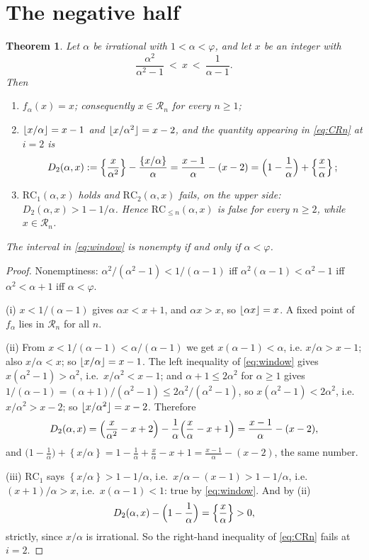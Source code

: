 \documentclass[11pt]{amsart}
\newtheorem{theorem}{Theorem}
\theoremstyle{remark}
\DeclarePairedDelimiter{\fl}{\lfloor}{\rfloor}
\newcommand{\fp}[1]{\left\{#1\right\}}
\newcommand{\RC}{\mathrm{RC}}
\begin{document}
\section{The negative half}\label{sec:B}

\begin{theorem}\label{thm:B}
Let $\alpha$ be irrational with $1<\alpha<\varphi$, and let $x$ be an integer with
\begin{equation}\label{eq:window}
 \frac{\alpha^{2}}{\alpha^{2}-1}\ <\ x\ <\ \frac1{\alpha-1}.
\end{equation}
Then
\begin{enumerate}
\item[(i)] $f_\alpha(x)=x$; consequently $x\in\mathcal R_n$ for every $n\ge1$;
\item[(ii)] $\fl{x/\alpha}=x-1$ and $\fl{x/\alpha^{2}}=x-2$, and the quantity appearing
 in \eqref{eq:CRn} at $i=2$ is
 \[
  D_2(\alpha,x):=\fp{\frac{x}{\alpha^{2}}}-\frac{\fp{x/\alpha}}{\alpha}
  =\frac{x-1}{\alpha}-(x-2)
  =\Bigl(1-\frac1\alpha\Bigr)+\fp{\frac x\alpha};
 \]
\item[(iii)] $\RC_1(\alpha,x)$ holds and $\RC_2(\alpha,x)$ fails, on the upper side:
 $D_2(\alpha,x)>1-1/\alpha$. Hence $\RC_{\le n}(\alpha,x)$ is false for every $n\ge2$,
 while $x\in\mathcal R_n$.
\end{enumerate}
The interval in \eqref{eq:window} is nonempty if and only if $\alpha<\varphi$.
\end{theorem}

\begin{proof}
Nonemptiness: $\alpha^{2}/(\alpha^{2}-1)<1/(\alpha-1)$ iff $\alpha^{2}(\alpha-1)<\alpha^{2}-1$
iff $\alpha^{2}<\alpha+1$ iff $\alpha<\varphi$.

(i) $x<1/(\alpha-1)$ gives $\alpha x<x+1$, and $\alpha x>x$, so $\fl{\alpha x}=x$. A
fixed point of $f_\alpha$ lies in $\mathcal R_n$ for all $n$.

(ii) From $x<1/(\alpha-1)<\alpha/(\alpha-1)$ we get $x(\alpha-1)<\alpha$, i.e.
$x/\alpha>x-1$; also $x/\alpha<x$; so $\fl{x/\alpha}=x-1$. The left inequality of
\eqref{eq:window} gives $x(\alpha^{2}-1)>\alpha^{2}$, i.e.\ $x/\alpha^{2}<x-1$; and
$\alpha+1\le2\alpha^{2}$ for $\alpha\ge1$ gives
$1/(\alpha-1)=(\alpha+1)/(\alpha^{2}-1)\le2\alpha^{2}/(\alpha^{2}-1)$, so
$x(\alpha^{2}-1)<2\alpha^{2}$, i.e.\ $x/\alpha^{2}>x-2$; so $\fl{x/\alpha^{2}}=x-2$.
Therefore
\[
 D_2(\alpha,x)
 =\Bigl(\frac{x}{\alpha^{2}}-x+2\Bigr)-\frac1\alpha\Bigl(\frac x\alpha-x+1\Bigr)
 =\frac{x-1}\alpha-(x-2),
\]
and $\bigl(1-\tfrac1\alpha\bigr)+\fp{x/\alpha}
=1-\tfrac1\alpha+\tfrac x\alpha-x+1=\tfrac{x-1}\alpha-(x-2)$, the same number.

(iii) $\RC_1$ says $\fp{x/\alpha}>1-1/\alpha$, i.e.\ $x/\alpha-(x-1)>1-1/\alpha$, i.e.\
$(x+1)/\alpha>x$, i.e.\ $x(\alpha-1)<1$: true by \eqref{eq:window}. And by (ii)
\[
 D_2(\alpha,x)-\Bigl(1-\frac1\alpha\Bigr)=\fp{\frac x\alpha}>0,
\]
strictly, since $x/\alpha$ is irrational. So the right-hand inequality of
\eqref{eq:CRn} fails at $i=2$.
\end{proof}
\end{document}
